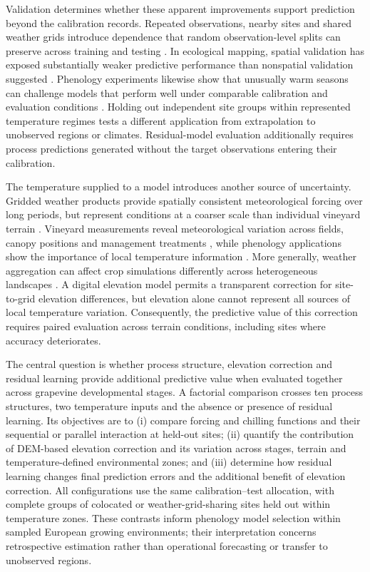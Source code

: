 \documentclass[a4paper,12pt]{article}
\begin{document}
Validation determines whether these apparent improvements support prediction beyond the calibration records. Repeated observations, nearby sites and shared weather grids introduce dependence that random observation-level splits can preserve across training and testing \citep{robertsCrossvalidationStrategiesData2017}. In ecological mapping, spatial validation has exposed substantially weaker predictive performance than nonspatial validation suggested \citep{plotonSpatialValidation2020}. Phenology experiments likewise show that unusually warm seasons can challenge models that perform well under comparable calibration and evaluation conditions \citep{fernandezUnusuallyWarmWinter2022}. Holding out independent site groups within represented temperature regimes tests a different application from extrapolation to unobserved regions or climates. Residual-model evaluation additionally requires process predictions generated without the target observations entering their calibration.

The temperature supplied to a model introduces another source of uncertainty. Gridded weather products provide spatially consistent meteorological forcing over long periods, but represent conditions at a coarser scale than individual vineyard terrain \citep{munozSabaterERA5Land2021}. Vineyard measurements reveal meteorological variation across fields, canopy positions and management treatments \citep{mateseSpatialVariability2014}, while phenology applications show the importance of local temperature information \citep{deresseguierModelingGrapevinePhenology2026}. More generally, weather aggregation can affect crop simulations differently across heterogeneous landscapes \citep{zhaoDemand2015}. A digital elevation model permits a transparent correction for site-to-grid elevation differences, but elevation alone cannot represent all sources of local temperature variation. Consequently, the predictive value of this correction requires paired evaluation across terrain conditions, including sites where accuracy deteriorates.

The central question is whether process structure, elevation correction and residual learning provide additional predictive value when evaluated together across grapevine developmental stages. A factorial comparison crosses ten process structures, two temperature inputs and the absence or presence of residual learning. Its objectives are to (i) compare forcing and chilling functions and their sequential or parallel interaction at held-out sites; (ii) quantify the contribution of DEM-based elevation correction and its variation across stages, terrain and temperature-defined environmental zones; and (iii) determine how residual learning changes final prediction errors and the additional benefit of elevation correction. All configurations use the same calibration--test allocation, with complete groups of colocated or weather-grid-sharing sites held out within temperature zones. These contrasts inform phenology model selection within sampled European growing environments; their interpretation concerns retrospective estimation rather than operational forecasting or transfer to unobserved regions.
\end{document}
